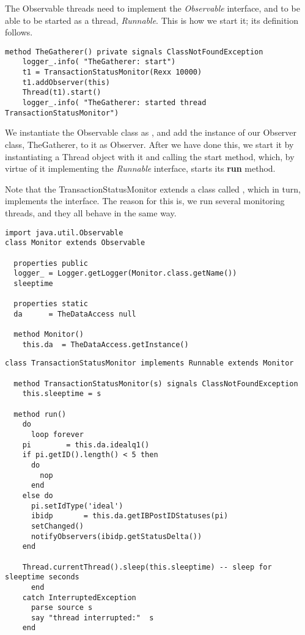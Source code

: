 {The Observable threads need to implement the \emph{Observable}
interface, and to be able to be started as a thread, \emph{Runnable}.
This is how we start it; its definition follows.

\begin{lstlisting}[label=obs2,caption=Observable: starting Observable Threads]
  method TheGatherer() private signals ClassNotFoundException
    logger_.info( "TheGatherer: start")
    t1 = TransactionStatusMonitor(Rexx 10000)
    t1.addObserver(this)
    Thread(t1).start()
    logger_.info( "TheGatherer: started thread TransactionStatusMonitor")
\end{lstlisting}

We instantiate the Observable class  as , and add the instance of
our Observer class, TheGatherer, to it as Observer. After we have done
this, we start it by instantiating a Thread object with it and calling
the start method, which, by virtue of it implementing the
\emph{Runnable} interface, starts its \textbf{run} method.

Note that the TransactionStatusMonitor extends a class called
, which in turn, implements the 
interface. The reason for this is, we run several monitoring threads,
and they all behave in the same way.
\begin{lstlisting}[label=obs4,caption=The Monitor Superclass]
import java.util.Observable
class Monitor extends Observable

  properties public
  logger_ = Logger.getLogger(Monitor.class.getName())
  sleeptime

  properties static
  da	  = TheDataAccess null
  
  method Monitor()
    this.da  = TheDataAccess.getInstance()
\end{lstlisting}

\begin{lstlisting}[label=obs3,caption=an Observable Thread]
class TransactionStatusMonitor implements Runnable extends Monitor
  
  method TransactionStatusMonitor(s) signals ClassNotFoundException
    this.sleeptime = s
    
  method run()
    do
      loop forever
	pi		  = this.da.idealq1()
	if pi.getID().length() < 5 then
	  do
	    nop
	  end
	else do
	  pi.setIdType('ideal')
	  ibidp		  = this.da.getIBPostIDStatuses(pi)
	  setChanged()
	  notifyObservers(ibidp.getStatusDelta())
	end
	
	Thread.currentThread().sleep(this.sleeptime) -- sleep for sleeptime seconds
      end
    catch InterruptedException
      parse source s
      say "thread interrupted:"  s
    end


\end{lstlisting}}

